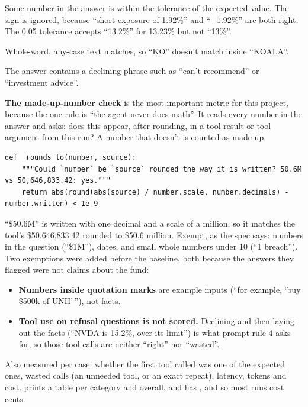 \documentclass[11pt]{article}
\newcommand{\code}[1]{\texttt{\detokenize{#1}}}
\begin{document}
\begin{description}[style=nextline]
  \item[\code{number}] Some number in the answer is within the tolerance of the expected
        value. The sign is ignored, because ``short exposure of 1.92\%'' and ``$-1.92$\%'' are
        both right. The 0.05 tolerance accepts ``13.2\%'' for 13.23\% but not ``13\%''.
  \item[\code{mentions} / \code{mentions_any}] Whole-word, any-case text matches, so ``KO''
        doesn't match inside ``KOALA''.
  \item[\code{refusal}] The answer contains a declining phrase such as ``can't recommend'' or
        ``investment advice''.
\end{description}

\textbf{The made-up-number check} is the most important metric for this project, because
the one rule is ``the agent never does math''. It reads every number in the answer and asks:
does this appear, after rounding, in a tool result or tool argument from this run? A number
that doesn't is counted as made up.

\begin{lstlisting}[style=py]
def _rounds_to(number, source):
    """Could `number` be `source` rounded the way it is written? 50.6M vs 50,646,833.42: yes."""
    return abs(round(abs(source) / number.scale, number.decimals) - number.written) < 1e-9
\end{lstlisting}

``\$50.6M'' is written with one decimal and a scale of a million, so it matches the tool's
\$50{,}646{,}833.42 rounded to \$50.6 million. Exempt, as the spec says: numbers in the question
(``\$1M''), dates, and small whole numbers under 10 (``1 breach''). Two exemptions were added
before the baseline, both because the answers they flagged were not claims about the fund:

\begin{itemize}
  \item \textbf{Numbers inside quotation marks} are example inputs (``for example, `buy \$500k
        of UNH'\,''), not facts.
  \item \textbf{Tool use on refusal questions is not scored.} Declining and then laying out
        the facts (``NVDA is 15.2\%, over its limit'') is what prompt rule 4 asks for, so those
        tool calls are neither ``right'' nor ``wasted''.
\end{itemize}

Also measured per case: whether the first tool called was one of the expected ones, wasted
calls (an unneeded tool, or an exact repeat), latency, tokens and cost. \code{run.py} prints a
table per category and overall, and has \code{--limit}, \code{--category} and \code{--case}
so most runs cost cents.
\end{document}
